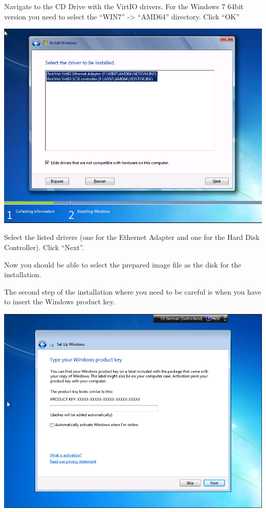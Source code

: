 \documentclass[letterpaper,10pt,english]{sphinxmanual}
\begin{document}
\begin{enumerate}
Navigate to the CD Drive with the VirtIO drivers. For the Windows 7 64bit version you need to select the “WIN7” -\textgreater{} “AMD64” directory. Click “OK”

\includegraphics{win7_select_driver.png}

Select the listed drivers (one for the Ethernet Adapter and one for the Hard Disk Controller). Click “Next”.

Now you should be able to select the prepared image file as the disk for the installation.

The second step of the installation where you need to be careful is when you have to insert the Windows product key.

\includegraphics{win7_licence.png}


\end{enumerate}
\end{document}

